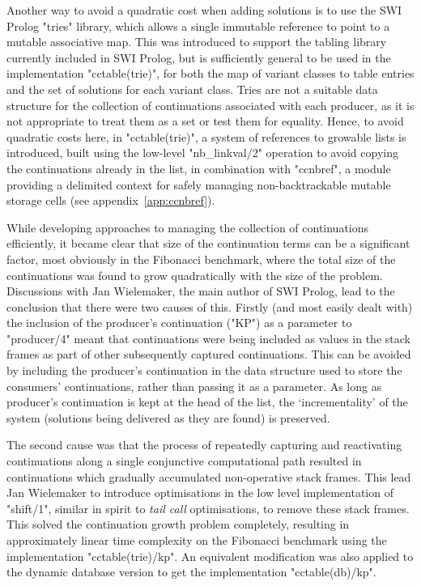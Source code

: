 Another way to avoid a quadratic cost when adding solutions is to use the SWI Prolog
"tries" library, which allows a single immutable reference to point to a mutable
associative map. This was introduced to support the tabling library currently included
in SWI Prolog, but is sufficiently general to be used in the implementation "cctable(trie)", 
for both the map of variant classes to table entries and the set of solutions for each
variant class.
%
Tries are not a suitable data structure for the collection of continuations associated
with each producer, as it is not appropriate to treat them as a set or test them for equality.
Hence, to avoid quadratic costs here, in "cctable(trie)", a system of references to 
growable lists is introduced, built using
the low-level "nb_linkval/2" operation to avoid copying the continuations already in the
list, in combination with "ccnbref", a module providing a delimited context for safely managing 
non-backtrackable mutable storage cells (see appendix~\ref{app:ccnbref}).

While developing approaches to managing the collection of continuations efficiently,
it became clear that size of the continuation terms can be a significant factor, %
most obviously in the Fibonacci benchmark, where the total size
of the continuations was found to grow quadratically with the size of the problem.
Discussions with Jan Wielemaker, the main author of SWI Prolog, lead to the conclusion
that there were two causes of this. Firstly (and most easily dealt with) the inclusion
of the producer's continuation ("KP") as a parameter to "producer/4" meant that continuations
were being included as values in the stack frames as part of other subsequently captured continuations.
This can be avoided by including the producer's continuation in the data structure used
to store the consumers' continuations, rather than passing it as a parameter. As long
as producer's continuation is kept at the head of the list, the 
`incrementality' of the system (solutions being delivered as they are found)
is preserved.

The second cause was that the process of 
repeatedly capturing and reactivating continuations along a single conjunctive computational path
resulted in continuations which gradually accumulated non-operative stack frames.
This lead Jan Wielemaker to introduce optimisations in the low level implementation of 
"shift/1", similar in spirit to \emph{tail call}
optimisations, to remove these stack frames.
This solved the continuation growth problem 
completely, resulting in approximately linear time complexity on the Fibonacci benchmark using
the implementation "cctable(trie)/kp".
An equivalent modification was also applied to the dynamic database version 
to get the implementation "cctable(db)/kp".

